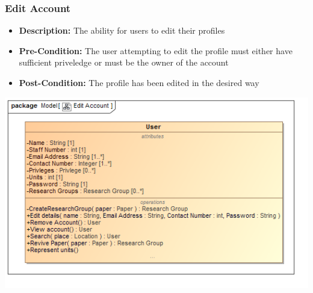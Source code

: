 \documentclass[11pt]{article}
\begin{document}
		\subsubsection{Edit Account}
		\begin{itemize}
			\item \textbf{Description: }The ability for users to edit their profiles
			\item \textbf{Pre-Condition: }The user attempting to edit the profile must either have sufficient priveledge or must be the owner of the account
			\item \textbf{Post-Condition: }The profile has been edited in the desired way
		\end{itemize}
		\begin{center}
			\includegraphics[width=\textwidth]{../Diagrams/DomainModel/EditAccount.png}\\[0.5cm]
		\end{center}
		\newpage
\end{document}
